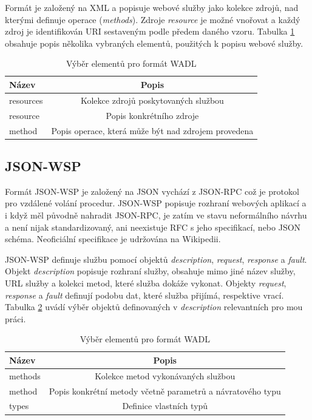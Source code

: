 \documentclass[czech,DP]{thesiskiv}
\begin{document}
Formát je založený na XML a popisuje webové služby jako kolekce zdrojů, nad kterými definuje operace (\textit{methods}). Zdroje \textit{resource} je možné vnořovat a každý zdroj je identifikován URI sestaveným podle předem daného vzoru. Tabulka \ref{tab:wadl-elements} obsahuje popis několika vybraných elementů, použitých k popisu webové služby.

\begin{table}[h]
	\centering
	\begin{tabular}{|l|c|}
		\hline
		Název & Popis \\
		\hline
		\hline
		resources & Kolekce zdrojů poskytovaných službou \\
		\hline
		resource & Popis konkrétního zdroje \\
		\hline
		method & Popis operace, která může být nad zdrojem provedena \\
		\hline
	\end{tabular}
	\caption{Výběr elementů pro formát WADL}
	\label{tab:wadl-elements} 
\end{table}
 
\subsection{JSON-WSP}

Formát JSON-WSP je založený na JSON vychází z JSON-RPC což je protokol pro vzdálené volání procedur. JSON-WSP popisuje rozhraní webových aplikací a i když měl původně nahradit JSON-RPC, je zatím ve stavu neformálního návrhu a není nijak standardizovaný, ani neexistuje RFC s jeho specifikací, nebo JSON schéma. Neoficiální specifikace je udržována na Wikipedii\cite{jsonWspSpec}.


JSON-WSP definuje službu pomocí objektů \textit{description}, \textit{request}, \textit{response} a \textit{fault}. Objekt \textit{description} popisuje rozhraní služby, obsahuje mimo jiné název služby, URL služby a kolekci metod, které služba dokáže vykonat. Objekty \textit{request}, \textit{response} a \textit{fault} definují podobu dat, které služba přijímá, respektive vrací. Tabulka \ref{tab:jsonwsp-elements} uvádí výběr objektů definovaných v \textit{description} relevantních pro mou práci.

\begin{table}[h]
	\centering
	\begin{tabular}{|l|c|}
		\hline
		Název & Popis \\
		\hline
		\hline
		methods & Kolekce metod vykonávaných službou \\
		\hline
		method & Popis konkrétní metody včetně parametrů a návratového typu \\
		\hline
		types & Definice vlastních typů \\
		\hline
	\end{tabular}
	\caption{Výběr elementů pro formát WADL}
	\label{tab:jsonwsp-elements} 
\end{table}
 
\end{document}
